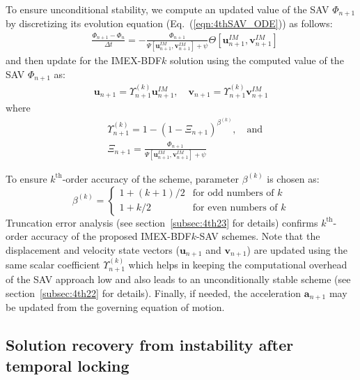 \documentclass[review]{elsarticle}
\begin{document}
To ensure unconditional stability, we compute an updated value of the SAV $\Phi_{n+1}$ by discretizing its evolution equation (Eq.~(\ref{eqn:4thSAV_ODE})) as follows:
\begin{align}
    & \frac{\Phi_{n+1}-\Phi_n}{\Delta t} = -\frac{\Phi_{n+1}}{\Psi[\boldsymbol{u}_{n+1}^{IM},\boldsymbol{v}_{n+1}^{IM}]+\psi}\Theta[\boldsymbol{u}_{n+1}^{IM},\boldsymbol{v}_{n+1}^{IM}] \label{eqn:4thBDFSAV}
\end{align}
and then update for the IMEX-BDF$k$ solution using the computed value of the SAV $\Phi_{n+1}$ as:
\begin{align}
    \boldsymbol{u}_{n+1} = \Upsilon^{(k)}_{n+1} \boldsymbol{u}_{n+1}^{IM}, \quad \boldsymbol{v}_{n+1} = \Upsilon^{(k)}_{n+1} \boldsymbol{v}_{n+1}^{IM} \label{eqn:4thupdated}
\end{align}
where
\begin{align}
    & \Upsilon^{(k)}_{n+1}=1-(1-\Xi_{n+1})^{\beta^{(k)}},
    \quad \textrm{and} \label{eqn:4thupsilon} \\
    & \Xi_{n+1}=\frac{\Phi_{n+1}}{\Psi[\boldsymbol{u}_{n+1}^{IM},\boldsymbol{v}_{n+1}^{IM}]+\psi} \label{eqn:4thxi}
\end{align}

To ensure $k^{\textrm{th}}$-order accuracy of the scheme, parameter $\beta^{(k)}$ is chosen as:
\begin{equation}
    \beta^{(k)} = \begin{cases}
        1+(k+1)/2& \textrm{for odd numbers of } k \\
        1+k/2& \textrm{for even numbers of  } k
    \end{cases}
    \label{eqn:4thbetaPara}
\end{equation}
Truncation error analysis (see section~\ref{subsec:4th23} for details) confirms $k^{\textrm{th}}$-order accuracy of the proposed IMEX-BDF$k$-SAV schemes. 
Note that the displacement and velocity state vectors ($\boldsymbol{u}_{n+1}$ and $\boldsymbol{v}_{n+1}$) are updated using the same scalar coefficient $\Upsilon^{(k)}_{n+1}$ which helps in keeping the computational overhead of the SAV approach low and also leads to an unconditionally stable scheme (see section~\ref{subsec:4th22} for details).
Finally, if needed, the acceleration $\boldsymbol{a}_{n+1}$ may be updated from the governing equation of motion. 

\subsection{Solution recovery from instability after temporal locking}
\end{document}
